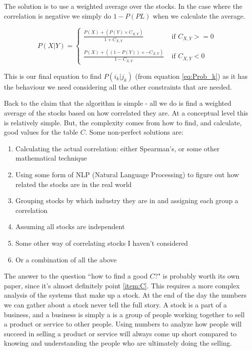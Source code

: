 \documentclass[11pt]{article}
\begin{document}
    The solution is to use a weighted average over the stocks.
    In the case where the correlation is negative we simply do \(1 - P(PL)\)
    when we calculate the average.

    \begin{equation} \label{eq:StockWeight}
        P ( X | Y ) = 
        \begin{cases}
            \displaystyle\frac 
                {P( X ) + (P ( Y ) \times C_{X, Y})}
                {1 + C_{X, Y}} 
                & \text{ if } C_{X, Y} >= 0\\
            \\
            \displaystyle\frac
                {P( X ) + ((1 - P ( Y )) \times - C_{X, Y})}
                {1 - C_{X, Y}} 
                & \text{ if } C_{X, Y} < 0
        \end{cases}
    \end{equation}

    This is our final equation to find \(P(i_k | j_k)\) (from equation \ref{eq:Prob_k})
    as it has the behaviour we need considering all the other constraints that are needed.

    Back to the claim that the algorithm is simple - all we do is find a
    weighted average of the stocks based on how correlated they are. At a conceptual level
    this is relatively simple. But, the complexity comes from how to find, and calculate,
    good values for the table \(C\). Some non-perfect solutions are:

    \begin{enumerate}
        \item{Calculating the actual correlation: either Spearman's, or some other mathematical technique}
        \item{Using some form of NLP (Natural Language Processing) to figure out how related the stocks are in the real world}
        \item{Grouping stocks by which industry they are in and assigning each group a correlation}
        \item{Assuming all stocks are independent}
        \item{Some other way of correlating stocks I haven't considered}
        \item{Or a combination of all the above}\label{item:C}
    \end{enumerate}

    The answer to the question ``how to find a good \(C\)?" is probably worth its own paper, since
    it's almost definitely point \ref{item:C}. This requires a more complex analysis of the systems
    that make up a stock. At the end of the day the numbers we can gather about a stock never
    tell the full story. A stock is a part of a business, and a business is simply a is a
    group of people working together to sell a product or service to other people.
    Using numbers to analyze how people will succeed in selling
    a product or service will always come up short compared to knowing and understanding
    the people who are ultimately doing the selling.
\end{document}
